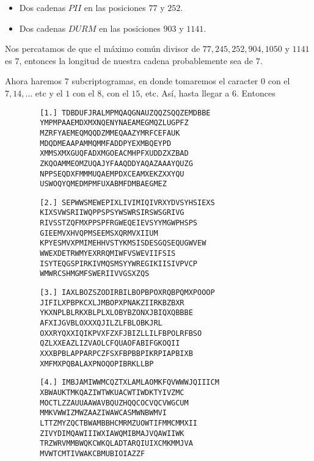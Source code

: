 \documentclass[letterpaper,11pt]{article}
\begin{document}
\begin{enumerate}
\begin{enumerate}
\begin{itemize}
            \item Dos cadenas $PII$ en las posiciones $77$ y $252$.

            \item Dos cadenas $DURM$ en las posiciones $903$ y $1141$.
        \end{itemize}
        
        Nos percatamos de que el máximo común divisor de $77, 245, 252, 904, 
        1050$ y $1141$ es $7$, entonces la longitud de nuestra cadena 
        probablemente sea de $7$.
        
        Ahora haremos $7$ subcriptogramas, en donde tomaremos el caracter $0$ 
        con el $7, 14, ...$ etc y el $1$ con el $8$, con el $15$, etc. Así, 
        hasta llegar a $6$. Entonces 

        \begin{verbatim}
        [1.] TDBDUFJRALMPMQAQGNAUZQQZSQQZEMDBBE
        YMPMPAAEMDXMXNQENYNAEAMEGMQZLUGPFZ
        MZRFYAEMEQMQQDZMMEQAAZYMRFCEFAUK
        MDQDMEAAPAMMQMMFADDPYEXMBQEYPD
        XMMSXMXGUQFADXMGOEACMHPFXUDDZXZBAD
        ZKQOAMMEOMZUQAJYFAAQDDYAQAZAAAYQUZG
        NPPSEQDXFMMMUQAEMPDXCEAMXEKZXXYQU
        USWOQYQMEDMPMFUXABMFDMBAEGMEZ    
        \end{verbatim}

        \begin{verbatim}
        [2.] SEPWWSMEWEPIXLIVIMIQIVRXYDVSYHSIEXS
        KIXSVWSRIIWQPPSPSYWSWRSIRSWSGRIVG
        RIVSSTZQFMXPPSPFRGWEQEIEVSYYMGWPHSPS
        GIEEMVXHVQPMSEEMSXQRMVXIIUM
        KPYESMVXPMIMEHHVSTYKMSISDESGQSEQUGWVEW
        WWEXDETRWMYEXRRQMIWFVSWEVIIFSIS
        ISYTEQGSPIRKIVMQSMSYYWREGIKIISIVPVCP
        WMWRCSHMGMFSWERIIVVGSXZQS
        \end{verbatim}

        \begin{verbatim}
        [3.] IAXLBOZSZODIRBILBOPBPOXRQBPQMXPOOOP
        JIFILXPBPKCXLJMBOPXPNAKZIIRKBZBXR
        YKXNPLBLRKXBLPLXLOBYBZONXJBIQXQBBBE
        AFXIJGVBLOXXXQJILZLFBLOBKJRL
        OXXRYQXXIQIKPVXFZXFJBIZLLILFBPOLRFBSO
        QZLXXEAZLIZVAOLCFQUAOFABIFGKOQII
        XXXBPBLAPPARPCZFSXFBPBBPIKRPIAPBIXB
        XMFMXPQBALAXPNOQOPIBRKLLBP
        \end{verbatim}

        \begin{verbatim}
        [4.] IMBJAMIWWMCQZTXLAMLAOMKFQVWWWJQIIICM
        XBWAUKTMKQAZIWTWKUACWTIWDKTYIVZMC
        MOCTLZZAUUAAWAVBQUZHQQCOCVQCVWGCUM
        MMKVWWIZMWZAAZIWAWCASMWNBWMVI
        LTTZMYZQCTBWAMBBHCMRMZUOWTIFMMCMMXII
        ZIVYDIMQAWIIIWXIAWQMIBMAJVQAWIIWK
        TRZWRVMMBWQKCWKQLADTARQIUIXCMKMMJVA
        MVWTCMTIVWAKCBMUBIOIAZZF
        \end{verbatim}


\end{enumerate}
\end{enumerate}
\end{document}
